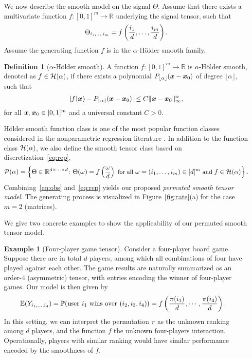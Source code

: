 \documentclass{article}
\theoremstyle{definition}
\newtheorem{defn}{Definition}
\newtheorem{example}{Example}
\begin{document}
We now describe the smooth model on the signal $\Theta$. Assume that there exists a multivariate function $f\colon [0,1]^m\rightarrow \mathbb{R}$ underlying the signal tensor, such that
\begin{align}\label{eq:rep}
\Theta_{i_1,\ldots,i_m} = f\left({i_1\over d},\ldots,{i_m\over d}\right).
\end{align}
Assume the generating function $f$ is in the $\alpha$-H\"older smooth family. 
\begin{defn}[$\alpha$-H\"older smooth]
A function $f\colon [0,1]^m\rightarrow \mathbb{R}$ is $\alpha$-H\"older smooth, denoted as $f\in\mathcal{H}(\alpha)$, if there exists a polynomial $P_{\lfloor \alpha\rfloor}(\bm x-\bm x_0)$ of degree  $\lfloor \alpha\rfloor$, such that 
\begin{align}\label{eq:defn}
    |f(\bm x) - P_{\lfloor \alpha\rfloor}(\bm x-\bm x_0)| \leq C\|\bm x-\bm x_0\|_\infty^\alpha,
\end{align}
for all $\bm x,\bm x_0\in [0,1]^m$ and a universal constant $C>0.$
\end{defn}
H\"older smooth function class is one of the most popular function classes considered in the nonparametric regression literature \citep{klopp2017oracle,gao2018minimax}. In addition to the function class $\mathcal{H}(\alpha)$, we also define the smooth tensor class based on discretization~\eqref{eq:rep}, 
\[
{\small \tP(\alpha)= \left\{\Theta\in\mathbb{R}^{d\times \cdots \times d} \colon\Theta(\omega) = f\left({\omega \over d}\right) \text{ for all } \omega=(i_1,\ldots,i_m) \in[d]^m \text{ and } f\in\tH(\alpha)\right\}.}
\]
Combining~\eqref{eq:obs} and~\eqref{eq:rep} yields our proposed \emph{permuted smooth tensor model}. The generating process is visualized in Figure~\ref{fig:rate}(a) for the case $m=2$ (matrices). 

We give two concrete examples to show the applicability of our permuted smooth tensor model. 

\begin{example}[Four-player game tensor] Consider a four-player board game. Suppose there are in total $d$ players, among which all combinations of four have played against each other. The game results are naturally summarized as an order-4 (asymmetric) tensor, with entries encoding the winner of four-player games. Our model is then given by
\begin{align}
\mathbb{E}(Y_{i_1,\ldots,i_4})&=\mathbb{P}(\text{user $i_1$ wins over $(i_2,i_3,i_4)$})
=f\left({\pi(i_1)\over d},\cdots, {\pi(i_4)\over d}\right).
\end{align}
In this setting, we can interpret the permutation $\pi$ as the unknown ranking among $d$ players, and the function $f$ the unknown four-players interaction. Operationally, players with similar ranking would have similar performance encoded by the smoothness of $f$. 
\end{example}
\end{document}

